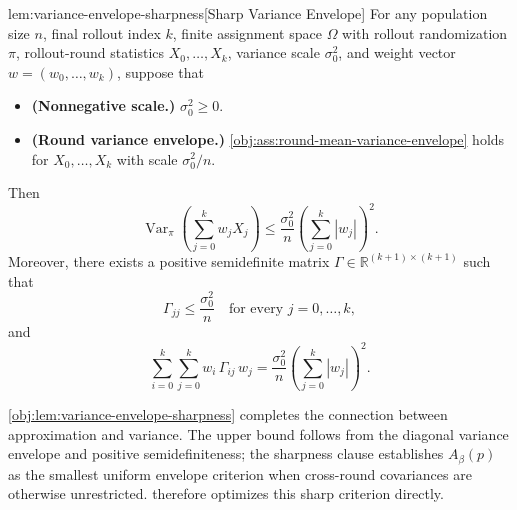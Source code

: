 \begin{lemmav}{lem:variance-envelope-sharpness}[Sharp Variance Envelope]
For any population size $n$, final rollout index $k$, finite assignment space $\Omega$ with rollout randomization $\pi$, rollout-round statistics $X_0,\ldots,X_k$, variance scale $\sigma_0^2$, and weight vector $w=(w_0,\ldots,w_k)$, suppose that
\begin{itemize}
\item \textbf{(Nonnegative scale.)} $\sigma_0^2\ge 0$.
\item \textbf{(Round variance envelope.)} \cref{obj:ass:round-mean-variance-envelope} holds for $X_0,\ldots,X_k$ with scale $\sigma_0^2/n$.
\end{itemize}
Then
\[
\operatorname{Var}_\pi\!\left(\sum_{j=0}^k w_j X_j\right)
\le
\frac{\sigma_0^2}{n}\left(\sum_{j=0}^k |w_j|\right)^2 .
\]
Moreover, there exists a positive semidefinite matrix
$\Gamma\in\mathbb R^{(k+1)\times(k+1)}$ such that
\[
\Gamma_{jj}\le \frac{\sigma_0^2}{n}\quad\text{for every }j=0,\ldots,k,
\]
and
\[
\sum_{i=0}^k\sum_{j=0}^k w_i\,\Gamma_{ij}\,w_j
=
\frac{\sigma_0^2}{n}\left(\sum_{j=0}^k |w_j|\right)^2 .
\]
\end{lemmav}

\cref{obj:lem:variance-envelope-sharpness} completes the connection between approximation and variance. The upper bound follows from the diagonal variance envelope and positive semidefiniteness; the sharpness clause establishes \(A_\beta(p)\) as the smallest uniform envelope criterion when cross-round covariances are otherwise unrestricted.  therefore optimizes this sharp criterion directly.

